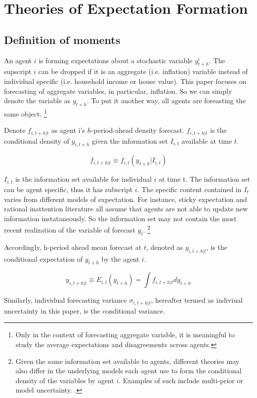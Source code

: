 \documentclass[]{article}
\begin{document}
\section{Theories of Expectation Formation}\label{theory}

\subsection{Definition of moments}

An agent $i$ is forming expectations about a stochastic variable $y^i_{t+h}$. The supscript $i$ can be dropped if it is an aggregate (i.e. inflation) variable instead of individual specific  (i.e. household income or house value). This paper focuses on forecasting of aggregate variables, in particular, inflation. So we can simply denote the variable as $y_{t+h}$. To put it another way, all agents are foreasting the same object. \footnote{Only in the context of forecasting aggregate variable, it is meaningful to study the average expectations and disagreements across agents.}

Denote $ f_{i,t+h|t}$ as agent i's $h$-period-ahead density forecast. $ f_{i,t+h|t}$ is the conditional density of $y_{i,t+h}$ given the information set $I_{i,t}$ available at time $t$. 

$$f_{i,t+h|t} \equiv f_{i,t}(y_{t+h}|I_{i,t})$$


$I_{i,t}$ is the information set available for individual $i$ at time t. The information set can be  agent specific, thus it has subscript $i$.  The specific content contained in $I_t$ varies from different models of expectation. For instance, sticky expectation and rational inattention literature all assume that agents are not able to update new information instataneously. So the information set may not contain the most recent realization of the variable of forecast $y_t$. \footnote{Given the same information set available to agents, different theories may also differ in the underlying models each agent use to form the conditional density of the variables by agent $i$. Examples of such include multi-prior or model uncertainty. \citet{xx}. }

Accordingly, h-period ahead mean forecast at $t$, denoted as $ y_{i,t+h|t}$, is the conditional expectation of $y_{t+h}$ by the agent $i$. 

$$y_{i,t+h|t} \equiv E_{i,t}(y_{t+h}) =\int f_{i, t+h|t} d y_{t+h}$$

Similarly, individual forecasting variance $\sigma_{i,t+h|t}$, hereafter termed as indiviual uncertainty in this paper, is the conditional variance.
\end{document}
